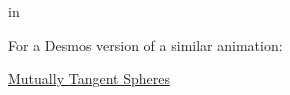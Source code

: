 \documentclass{ximera}
\newcommand{\pskip}{\vskip 0.1 in}
\begin{document}
 
\begin{onlineOnly}
    \begin{center}
\end{center}
\end{onlineOnly}


\pskip
 
For a Desmos version of a similar animation:

\href{https://www.desmos.com/3d/7fb88aea41}{Mutually Tangent Spheres}
\end{document}
